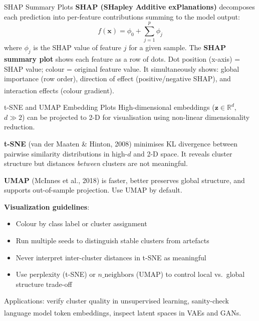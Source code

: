 \begin{v3topic}{SHAP Summary Plots}
    \textbf{SHAP (SHapley Additive exPlanations)} decomposes each prediction into
    per-feature contributions summing to the model output:
    \begin{equation}
        f(\mathbf{x}) = \phi_0 + \sum_{j=1}^{p} \phi_j
    \end{equation}
    where $\phi_j$ is the SHAP value of feature $j$ for a given sample.
    The \textbf{SHAP summary plot} shows each feature as a row of dots. Dot position
    (x-axis) = SHAP value; colour = original feature value. It simultaneously shows:
    global importance (row order), direction of effect (positive/negative SHAP),
    and interaction effects (colour
    gradient)\textsuperscript{\cite[][pp.~220--230]{raschkaPythonMachineLearning2015}}.

\end{v3topic}
\begin{v3topic}{t-SNE and UMAP Embedding Plots}
    High-dimensional embeddings ($\mathbf{z} \in \mathbb{R}^d$, $d \gg 2$) can be
    projected to 2-D for visualisation using non-linear dimensionality reduction.

    \textbf{t-SNE} (van der Maaten \& Hinton, 2008) minimises KL divergence between
    pairwise similarity distributions in high-$d$ and 2-D space. It reveals cluster
    structure but distances \emph{between} clusters are not meaningful.

    \textbf{UMAP} (McInnes et al., 2018) is faster, better preserves global structure,
    and supports out-of-sample projection. Use UMAP by default.

    \textbf{Visualization guidelines}:
    \begin{itemize}
        \item Colour by class label or cluster assignment
        \item Run multiple seeds to distinguish stable clusters from artefacts
        \item Never interpret inter-cluster distances in t-SNE as meaningful
        \item Use perplexity (t-SNE) or $n\_\text{neighbors}$ (UMAP) to control
              local vs.\ global structure trade-off
    \end{itemize}
    Applications: verify cluster quality in unsupervised learning, sanity-check language
    model token embeddings, inspect latent spaces in VAEs and
    GANs\textsuperscript{\cite[][pp.~310--320]{raschkaPythonMachineLearning2015}}.
\end{v3topic}


